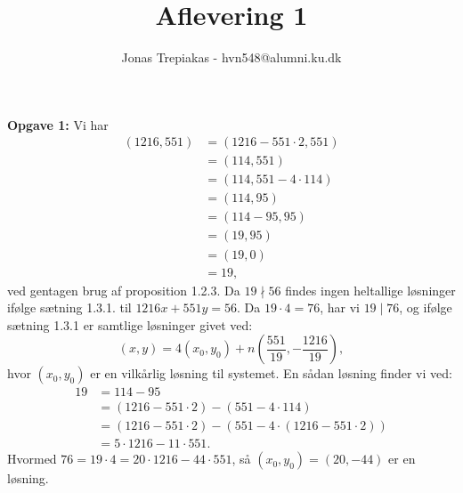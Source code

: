 \documentclass[a4paper]{article}
\title{Aflevering 1}
\author{Jonas Trepiakas - hvn548@alumni.ku.dk}
\date{}
\begin{document}
\maketitle
\newpage
    \textbf{Opgave 1:} Vi har
    \begin{align*}
        (1216,551) &= (1216 - 551 \cdot 2, 551)\\
                   &= (114, 551)\\
                   &= (114, 551 - 4\cdot 114)\\
                   &= (114,95)\\
                   &= (114-95, 95)\\
                   &= (19,95)\\
                   &= (19,0)\\
                   &= 19,
    \end{align*}
ved gentagen brug af proposition 1.2.3. Da $19 \nmid  56$ findes ingen
heltallige løsninger ifølge sætning 1.3.1. til
$1216 x+ 551y = 56$. Da $19 \cdot 4 = 76$, har vi $19  \mid 76$, og ifølge
sætning 1.3.1 er samtlige løsninger givet ved:
\[
    (x,y) = 4 \left( x_0, y_0 \right) + n \left(
    \frac{551}{19},-\frac{1216}{19} \right),
\] 
hvor $(x_0,y_0)$ er en vilkårlig løsning til systemet. En sådan løsning finder
vi ved:
\begin{align*}
    19 &= 114 - 95\\
       &= (1216-551 \cdot 2) - (551 - 4\cdot 114)\\
       &= (1216 - 551\cdot 2) - (551 - 4\cdot (1216- 551\cdot 2))\\
       &= 5 \cdot 1216 - 11\cdot 551
.\end{align*}
Hvormed $76 = 19\cdot 4 = 20 \cdot 1216 - 44 \cdot 551$, så $(x_0,
y_0)=(20,-44)$ er en løsning.
\end{document}
